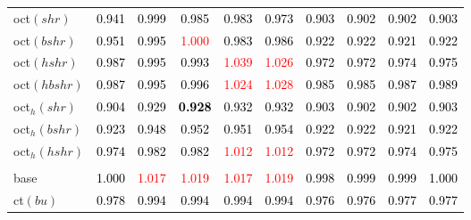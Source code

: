 \begin{tabular}[t]{l|ccccccccc}
oct$(shr)$ & \textcolor{black}{0.941} & \textcolor{black}{0.999} & \textcolor{black}{0.985} & \textcolor{black}{0.983} & \textcolor{black}{0.973} & \textcolor{black}{0.903} & \textcolor{black}{0.902} & \textcolor{black}{0.902} & \textcolor{black}{0.903}\\
oct$(bshr)$ & \textcolor{black}{0.951} & \textcolor{black}{0.995} & \textcolor{red}{1.000} & \textcolor{black}{0.983} & \textcolor{black}{0.986} & \textcolor{black}{0.922} & \textcolor{black}{0.922} & \textcolor{black}{0.921} & \textcolor{black}{0.922}\\
oct$(hshr)$ & \textcolor{black}{0.987} & \textcolor{black}{0.995} & \textcolor{black}{0.993} & \textcolor{red}{1.039} & \textcolor{red}{1.026} & \textcolor{black}{0.972} & \textcolor{black}{0.972} & \textcolor{black}{0.974} & \textcolor{black}{0.975}\\
oct$(hbshr)$ & \textcolor{black}{0.987} & \textcolor{black}{0.995} & \textcolor{black}{0.996} & \textcolor{red}{1.024} & \textcolor{red}{1.028} & \textcolor{black}{0.985} & \textcolor{black}{0.985} & \textcolor{black}{0.987} & \textcolor{black}{0.989}\\
oct$_h(shr)$ & \textcolor{black}{0.904} & \textcolor{black}{0.929} & \textcolor{black}{\textbf{0.928}} & \textcolor{black}{0.932} & \textcolor{black}{0.932} & \textcolor{black}{0.903} & \textcolor{black}{0.902} & \textcolor{black}{0.902} & \textcolor{black}{0.903}\\
oct$_h(bshr)$ & \textcolor{black}{0.923} & \textcolor{black}{0.948} & \textcolor{black}{0.952} & \textcolor{black}{0.951} & \textcolor{black}{0.954} & \textcolor{black}{0.922} & \textcolor{black}{0.922} & \textcolor{black}{0.921} & \textcolor{black}{0.922}\\
oct$_h(hshr)$ & \textcolor{black}{0.974} & \textcolor{black}{0.982} & \textcolor{black}{0.982} & \textcolor{red}{1.012} & \textcolor{red}{1.012} & \textcolor{black}{0.972} & \textcolor{black}{0.972} & \textcolor{black}{0.974} & \textcolor{black}{0.975}\\
\addlinespace[0.3em]
\multicolumn{10}{c}{\textbf{$k = 1$}}\\
base & \textcolor{black}{1.000} & \textcolor{red}{1.017} & \textcolor{red}{1.019} & \textcolor{red}{1.017} & \textcolor{red}{1.019} & \textcolor{black}{0.998} & \textcolor{black}{0.999} & \textcolor{black}{0.999} & \textcolor{black}{1.000}\\
ct$(bu)$ & \textcolor{black}{0.978} & \textcolor{black}{0.994} & \textcolor{black}{0.994} & \textcolor{black}{0.994} & \textcolor{black}{0.994} & \textcolor{black}{0.976} & \textcolor{black}{0.976} & \textcolor{black}{0.977} & \textcolor{black}{0.977}\\

\end{tabular}
